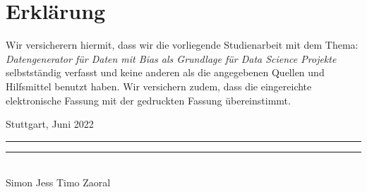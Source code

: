
\thispagestyle{empty}

\section*{Erklärung}

\vspace*{2em}
Wir versicherern hiermit, dass wir die vorliegende Studienarbeit mit dem Thema: \textit{Datengenerator für Daten mit Bias als Grundlage für Data Science Projekte} selbstständig verfasst und keine anderen als die angegebenen Quellen und Hilfsmittel benutzt haben. Wir versichern zudem, dass die eingereichte elektronische Fassung mit der gedruckten Fassung übereinstimmt. 

\vspace{3em}

Stuttgart, Juni 2022
\vspace{3em} \\
\rule{6cm}{0.4pt} \quad \quad \rule{6cm}{0.4pt}\\
Simon Jess \hspace{4.8cm} Timo Zaoral